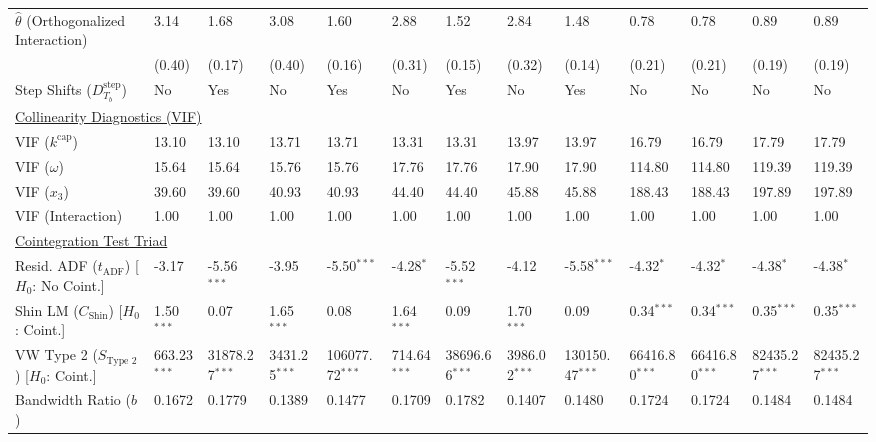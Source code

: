 \begin{table}[H]
\begin{tabular}{p{3.8cm}p{1.5cm}p{1.5cm}p{1.5cm}p{1.5cm}p{1.5cm}p{1.5cm}p{1.5cm}p{1.5cm}p{1.5cm}p{1.5cm}p{1.5cm}p{1.5cm}}
$\hat{\theta}$ (Orthogonalized Interaction)  & 3.14 & 1.68 & 3.08 & 1.60 & 2.88 & 1.52 & 2.84 & 1.48 & 0.78 & 0.78 & 0.89 & 0.89  \\
 & {\scriptsize (0.40)} & {\scriptsize (0.17)} & {\scriptsize (0.40)} & {\scriptsize (0.16)} & {\scriptsize (0.31)} & {\scriptsize (0.15)} & {\scriptsize (0.32)} & {\scriptsize (0.14)} & {\scriptsize (0.21)} & {\scriptsize (0.21)} & {\scriptsize (0.19)} & {\scriptsize (0.19)}  \\
Step Shifts ($D^{\text{step}}_{T_b}$)  & No & Yes & No & Yes & No & Yes & No & Yes & No & No & No & No  \\
\midrule
\multicolumn{13}{l}{\underline{Collinearity Diagnostics (VIF)}} \\
VIF ($k^{\text{cap}}$) & 13.10 & 13.10 & 13.71 & 13.71 & 13.31 & 13.31 & 13.97 & 13.97 & 16.79 & 16.79 & 17.79 & 17.79  \\
VIF ($\omega$) & 15.64 & 15.64 & 15.76 & 15.76 & 17.76 & 17.76 & 17.90 & 17.90 & 114.80 & 114.80 & 119.39 & 119.39  \\
VIF ($x_3$) & 39.60 & 39.60 & 40.93 & 40.93 & 44.40 & 44.40 & 45.88 & 45.88 & 188.43 & 188.43 & 197.89 & 197.89  \\
VIF (Interaction) & 1.00 & 1.00 & 1.00 & 1.00 & 1.00 & 1.00 & 1.00 & 1.00 & 1.00 & 1.00 & 1.00 & 1.00  \\
\midrule
\multicolumn{13}{l}{\underline{Cointegration Test Triad}} \\
\makecell[l]{Resid. ADF ($t_{\text{ADF}}$) \\ {\scriptsize [$H_0$: No Coint.]}} & -3.17 & -5.56$^{***}$ & -3.95 & -5.50$^{***}$ & -4.28$^{*}$ & -5.52$^{***}$ & -4.12 & -5.58$^{***}$ & -4.32$^{*}$ & -4.32$^{*}$ & -4.38$^{*}$ & -4.38$^{*}$  \\
\makecell[l]{Shin LM ($C_{\text{Shin}}$) \\ {\scriptsize [$H_0$: Coint.]}} & 1.50$^{***}$ & 0.07 & 1.65$^{***}$ & 0.08 & 1.64$^{***}$ & 0.09 & 1.70$^{***}$ & 0.09 & 0.34$^{***}$ & 0.34$^{***}$ & 0.35$^{***}$ & 0.35$^{***}$  \\
\makecell[l]{VW Type 2 ($S_{\text{Type 2}}$) \\ {\scriptsize [$H_0$: Coint.]}} & 663.23$^{***}$ & 31878.27$^{***}$ & 3431.25$^{***}$ & 106077.72$^{***}$ & 714.64$^{***}$ & 38696.66$^{***}$ & 3986.02$^{***}$ & 130150.47$^{***}$ & 66416.80$^{***}$ & 66416.80$^{***}$ & 82435.27$^{***}$ & 82435.27$^{***}$  \\
\midrule
Bandwidth Ratio ($b$) & 0.1672 & 0.1779 & 0.1389 & 0.1477 & 0.1709 & 0.1782 & 0.1407 & 0.1480 & 0.1724 & 0.1724 & 0.1484 & 0.1484  \\

\end{tabular}
\end{table}
